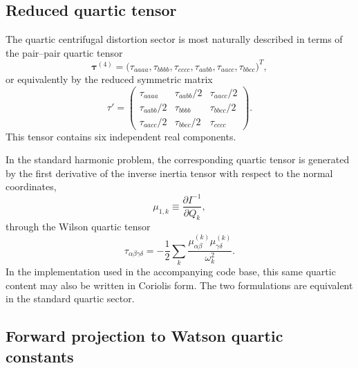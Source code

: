 \documentclass[journal=jacsat,manuscript=article]{achemso}
\begin{document}
\subsection{Reduced quartic tensor}

The quartic centrifugal distortion sector is most naturally described in terms
of the pair--pair quartic tensor
\begin{equation}
\boldsymbol\tau^{(4)} =
\bigl(
\tau_{aaaa},\tau_{bbbb},\tau_{cccc},
\tau_{aabb},\tau_{aacc},\tau_{bbcc}
\bigr)^T ,
\end{equation}
or equivalently by the reduced symmetric matrix
\begin{equation}
\tau'=
\begin{pmatrix}
\tau_{aaaa} & \tau_{aabb}/2 & \tau_{aacc}/2 \\
\tau_{aabb}/2 & \tau_{bbbb} & \tau_{bbcc}/2 \\
\tau_{aacc}/2 & \tau_{bbcc}/2 & \tau_{cccc}
\end{pmatrix}.
\end{equation}
This tensor contains six independent real components.

In the standard harmonic problem, the corresponding quartic tensor is generated
by the first derivative of the inverse inertia tensor with respect to the
normal coordinates,
\begin{equation}
\mu_{1,k} \equiv \frac{\partial I^{-1}}{\partial Q_k},
\end{equation}
through the Wilson quartic tensor
\begin{equation}
\tau_{\alpha\beta\gamma\delta}
=
-\frac12
\sum_k
\frac{
\mu_{\alpha\beta}^{(k)}
\mu_{\gamma\delta}^{(k)}
}{\omega_k^2}.
\label{eq:app_quartic_tau}
\end{equation}
In the implementation used in the accompanying code base, this same quartic
content may also be written in Coriolis form. The two formulations are
equivalent in the standard quartic sector.

\subsection{Forward projection to Watson quartic constants}
\end{document}
